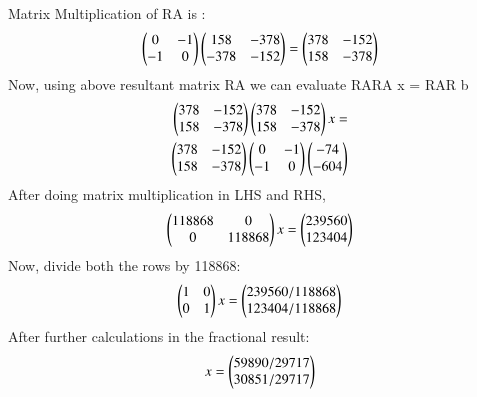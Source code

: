 \documentclass[journal,12pt,twocolumn]{IEEEtran}
\begin{document}
Matrix Multiplication of RA is :
\begin{align}
\begin{pmatrix}0 & -1 \\ -1 & 0\end{pmatrix}
\begin{pmatrix}158 & -378 \\ -378 & -152\end{pmatrix} =
\begin{pmatrix}378 & -152 \\ 158 & -378\end{pmatrix}
\end{align}
Now, using above resultant matrix RA we can evaluate 
RARA x = RAR b
\begin{align}
\begin{pmatrix}378 & -152 \\ 158 & -378\end{pmatrix}
\begin{pmatrix}378 & -152 \\ 158 & -378\end{pmatrix}x = \nonumber \\
\begin{pmatrix}378 & -152 \\ 158 & -378\end{pmatrix}
\begin{pmatrix}0 & -1 \\ -1 & 0\end{pmatrix}
\begin{pmatrix}-74 \\ -604\end{pmatrix}
\end{align}
After doing matrix multiplication in LHS and RHS,
\begin{align}
\begin{pmatrix}118868 & 0 \\ 0 & 118868\end{pmatrix}x =
\begin{pmatrix}239560 \\ 123404\end{pmatrix}
\end{align}
Now, divide both the rows by 118868:
\begin{align}
\begin{pmatrix}1 & 0 \\ 0 & 1\end{pmatrix}x =
\begin{pmatrix}239560/118868 \\ 123404/118868\end{pmatrix}
\end{align}
After further calculations in the fractional result:
\begin{align}
x =\begin{pmatrix}59890/29717 \\ 30851/29717\end{pmatrix}
\end{align}
\end{document}
